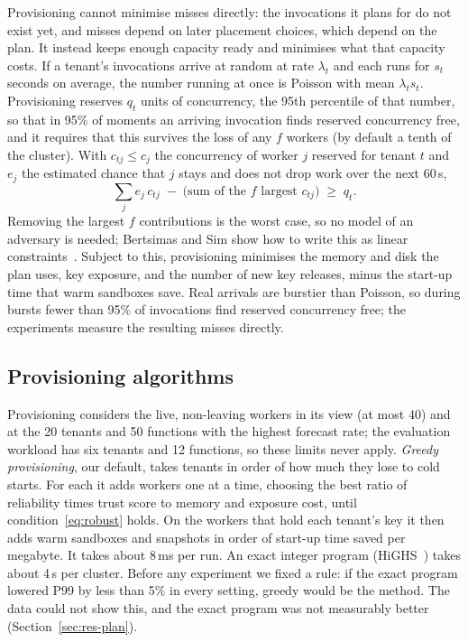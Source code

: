 Provisioning cannot minimise misses directly: the invocations it plans for do not exist yet, and misses depend on later
placement choices, which depend on the plan. It instead keeps enough capacity ready and minimises what that capacity costs.
If a tenant's invocations arrive at random at rate $\lambda_t$ and each runs for $s_t$ seconds on average, the
number running at once is Poisson with mean $\lambda_ts_t$. Provisioning reserves $q_t$ units of concurrency, the 95th percentile of that
number, so that in 95\% of moments an arriving invocation finds reserved concurrency free, and it requires that this survives the loss of
any $f$ workers (by default a tenth of the cluster). With $c_{tj}\le c_j$ the concurrency of worker $j$ reserved for tenant $t$ and $e_j$
the estimated chance that $j$ stays and does not drop work over the next 60\,s,
\begin{equation}
\sum_j e_j\,c_{tj} \;-\; \bigl(\text{sum of the } f \text{ largest } c_{tj}\bigr) \;\ge\; q_t .
\label{eq:robust}
\end{equation}
Removing the largest $f$ contributions is the worst case, so no model of an adversary is needed; Bertsimas and Sim show how
to write this as linear constraints~\cite{bertsimas2004price}. Subject to this, provisioning minimises the memory and disk the
plan uses, key exposure, and the number of new key releases, minus the start-up time that warm sandboxes save. Real arrivals
are burstier than Poisson, so during bursts fewer than 95\% of invocations find reserved concurrency free; the experiments measure the
resulting misses directly.

\subsection{Provisioning algorithms}
Provisioning considers the live, non-leaving workers in its view (at most 40) and at the 20 tenants and 50 functions with the
highest forecast rate; the evaluation workload has six tenants and 12 functions, so these limits never apply. \emph{Greedy
provisioning}, our default, takes tenants in order of how much they lose to cold starts. For each it adds workers one
at a time, choosing the best ratio of reliability times trust score to memory and exposure cost, until
condition~\eqref{eq:robust} holds. On the workers that hold each tenant's key it then adds warm sandboxes and snapshots in
order of start-up time saved per megabyte. It takes about 8\,ms per run. An exact integer program (HiGHS~\cite{huangfu2018highs})
takes about 4\,s per cluster. Before any experiment we fixed a rule: if the exact program lowered P99 by less than 5\% in every
setting, greedy would be the method. The data could not show this, and the exact program was not measurably better
(Section~\ref{sec:res-plan}).

